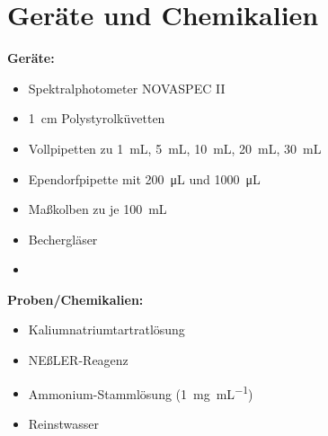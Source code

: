 \newpage
\section{Geräte und Chemikalien}
\label{sec:geraete}

\textbf{Geräte:}
\begin{itemize}
\item Spektralphotometer NOVASPEC II
\item \SI{1}{\centi\meter} Polystyrolküvetten
\item Vollpipetten zu \SI{1}{\milli\liter}, \SI{5}{\milli\liter}, \SI{10}{\milli\liter}, \SI{20}{\milli\liter}, \SI{30}{\milli\liter}
\item Ependorfpipette mit \SI{200}{\micro\liter} und \SI{1000}{\micro\liter}
\item Maßkolben zu je \SI{100}{\milli\liter}
\item Bechergläser
\item 
\end{itemize}

\vspace*{5mm}

\textbf{Proben/Chemikalien:}
\begin{itemize}
\item Kaliumnatriumtartratlösung
\item NEßLER-Reagenz
\item Ammonium-Stammlösung (\SI{1}{\milli\gram\per\milli\liter})
\item Reinstwasser
\end{itemize}





